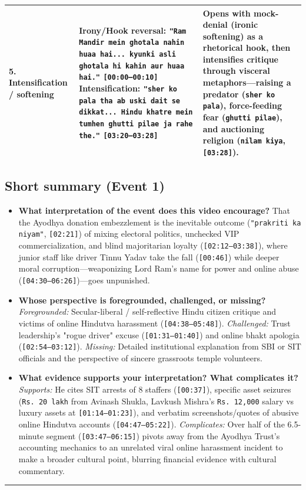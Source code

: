\documentclass[10pt,a4paper]{article}
\begin{document}
\begin{longtable}{@{}>{\raggedright\arraybackslash}p{} >{\raggedright\arraybackslash}p{} >{\raggedright\arraybackslash}p{}@{}}
\addlinespace[4pt]
\textbf{5. Intensification / softening} & \textbf{Irony/Hook reversal:} \texttt{"Ram Mandir mein ghotala nahin huaa hai... kyunki asli ghotala hi kahin aur huaa hai."} \texttt{[00:00--00:10]} \newline  \textbf{Intensification:} \texttt{"sher ko pala tha ab uski dait se dikkat... Hindu khatre mein tumhen ghutti pilae ja rahe the."} \texttt{[03:20--03:28]} & Opens with mock-denial (ironic softening) as a rhetorical hook, then intensifies critique through visceral metaphors---raising a predator (\texttt{sher ko pala}), force-feeding fear (\texttt{ghutti pilae}), and auctioning religion (\texttt{nilam kiya}, \texttt{[03:28]}). \\
\bottomrule
\end{longtable}

\subsection*{Short summary (Event 1)}
\begin{itemize}[leftmargin=1.5em, itemsep=3pt, topsep=4pt]
  \item \textbf{What interpretation of the event does this video encourage?} That the Ayodhya donation embezzlement is the inevitable outcome (\texttt{"prakriti ka niyam"}, \texttt{[02:21]}) of mixing electoral politics, unchecked VIP commercialization, and blind majoritarian loyalty (\texttt{[02:12--03:38]}), where junior staff like driver Tinnu Yadav take the fall (\texttt{[00:46]}) while deeper moral corruption---weaponizing Lord Ram's name for power and online abuse (\texttt{[04:30--06:26]})---goes unpunished.
  \item \textbf{Whose perspective is foregrounded, challenged, or missing?} \textit{Foregrounded:} Secular-liberal / self-reflective Hindu citizen critique and victims of online Hindutva harassment (\texttt{[04:38--05:48]}). \textit{Challenged:} Trust leadership's "rogue driver" excuse (\texttt{[01:31--01:40]}) and online bhakt apologia (\texttt{[02:54--03:12]}). \textit{Missing:} Detailed institutional explanation from SBI or SIT officials and the perspective of sincere grassroots temple volunteers.
  \item \textbf{What evidence supports your interpretation? What complicates it?} \textit{Supports:} He cites SIT arrests of 8 staffers (\texttt{[00:37]}), specific asset seizures (\texttt{Rs.\,20 lakh} from Avinash Shukla, Lavkush Mishra's \texttt{Rs.\,12,000} salary vs luxury assets at \texttt{[01:14--01:23]}), and verbatim screenshots/quotes of abusive online Hindutva accounts (\texttt{[04:47--05:22]}). \textit{Complicates:} Over half of the 6.5-minute segment (\texttt{[03:47--06:15]}) pivots away from the Ayodhya Trust's accounting mechanics to an unrelated viral online harassment incident to make a broader cultural point, blurring financial evidence with cultural commentary.
\end{itemize}
\vspace{4pt}\noindent\rule{\textwidth}{0.4pt}\vspace{4pt}
\end{document}
